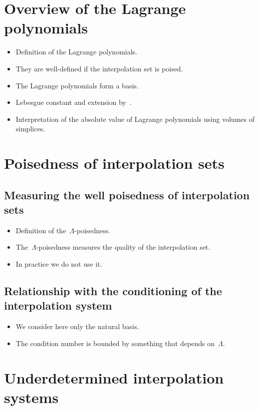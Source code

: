 \section{Overview of the Lagrange polynomials}

\begin{itemize}
    \item Definition of the Lagrange polynomials.
    \item They are well-defined if the interpolation set is poised.
    \item The Lagrange polynomials form a basis.
    \item Lebesgue constant and extension by~\cite{Ciarlet_Raviart_1972}.
    \item Interpretation of the absolute value of Lagrange polynomials using volumes of simplices.
\end{itemize}

\section{Poisedness of interpolation sets}
\label{sec:poisedness}

\subsection{Measuring the well poisedness of interpolation sets}

\begin{itemize}
    \item Definition of the~$\Lambda$-poisedness.
    \item The~$\Lambda$-poisedness measures the quality of the interpolation set.
    \item In practice we do not use it.
\end{itemize}

\subsection{Relationship with the conditioning of the interpolation system}

\begin{itemize}
    \item We consider here only the natural basis.
    \item The condition number is bounded by something that depends on~$\Lambda$.
\end{itemize}

\section{Underdetermined interpolation systems}
\label{sec:underdetermined-interpolation}

